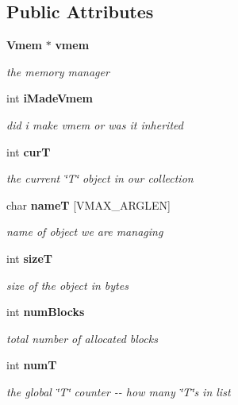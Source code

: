 \subsection*{Public Attributes}
\begin{DoxyCompactItemize}
\item 
{\bf Vmem} $\ast$ {\bf vmem}
\begin{DoxyCompactList}\small\item\em the memory manager \item\end{DoxyCompactList}\item 
int {\bf iMadeVmem}
\begin{DoxyCompactList}\small\item\em did i make vmem or was it inherited \item\end{DoxyCompactList}\item 
int {\bf curT}
\begin{DoxyCompactList}\small\item\em the current \char`\"{}T\char`\"{} object in our collection \item\end{DoxyCompactList}\item 
char {\bf nameT} [VMAX\_\-ARGLEN]
\begin{DoxyCompactList}\small\item\em name of object we are managing \item\end{DoxyCompactList}\item 
int {\bf sizeT}
\begin{DoxyCompactList}\small\item\em size of the object in bytes \item\end{DoxyCompactList}\item 
int {\bf numBlocks}
\begin{DoxyCompactList}\small\item\em total number of allocated blocks \item\end{DoxyCompactList}\item 
int {\bf numT}
\begin{DoxyCompactList}\small\item\em the global \char`\"{}T\char`\"{} counter -\/-\/ how many \char`\"{}T\char`\"{}s in list \item\end{DoxyCompactList}\item 

\end{DoxyCompactItemize}
